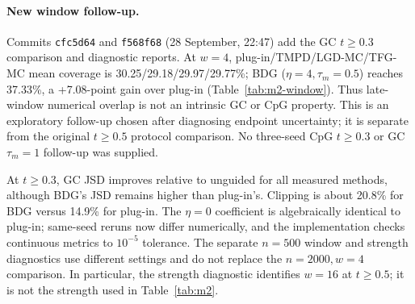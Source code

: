 \documentclass{article}
\begin{document}
\paragraph{New window follow-up.} Commits \texttt{cfc5d64} and \texttt{f568f68} (28 September, 22:47) add the GC $t\ge0.3$ comparison and diagnostic reports. At $w=4$, plug-in/TMPD/LGD-MC/TFG-MC mean coverage is 30.25/29.18/29.97/29.77\%; BDG ($\eta=4,\tau_m=0.5$) reaches 37.33\%, a +7.08-point gain over plug-in (Table~\ref{tab:m2-window}). Thus late-window numerical overlap is not an intrinsic GC or CpG property. This is an exploratory follow-up chosen after diagnosing endpoint uncertainty; it is separate from the original $t\ge0.5$ protocol comparison. No three-seed CpG $t\ge0.3$ or GC $\tau_m=1$ follow-up was supplied.

At $t\ge0.3$, GC JSD improves relative to unguided for all measured methods, although BDG's JSD remains higher than plug-in's. Clipping is about 20.8\% for BDG versus 14.9\% for plug-in. The $\eta=0$ coefficient is algebraically identical to plug-in; same-seed reruns now differ numerically, and the implementation checks continuous metrics to $10^{-5}$ tolerance. The separate $n=500$ window and strength diagnostics use different settings and do not replace the $n=2000,w=4$ comparison. In particular, the strength diagnostic identifies $w=16$ at $t\ge0.5$; it is not the strength used in Table~\ref{tab:m2}.
\end{document}
